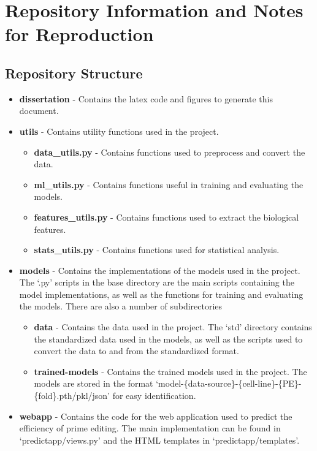 \chapter{Repository Information and Notes for Reproduction}
\label{appendix:repository}

\section{Repository Structure}

\begin{itemize}
    \item \textbf{dissertation} - Contains the latex code and figures to generate this document.
    \item \textbf{utils} - Contains utility functions used in the project. \begin{itemize}
        \item \textbf{data\_utils.py} - Contains functions used to preprocess and convert the data.
        \item \textbf{ml\_utils.py} - Contains functions useful in training and evaluating the models.
        \item \textbf{features\_utils.py} - Contains functions used to extract the biological features.
        \item \textbf{stats\_utils.py} - Contains functions used for statistical analysis.
    \end{itemize}
    \item \textbf{models} - Contains the implementations of the models used in the project. The `.py' scripts in the base directory are the main scripts containing the model implementations, as well as the functions for training and evaluating the models. 
    There are also a number of subdirectories
    \begin{itemize}
        \item \textbf{data} - Contains the data used in the project. The `std' directory contains the standardized data used in the models, as well as the scripts used to convert the data to and from the standardized format.
        \item \textbf{trained-models} - Contains the trained models used in the project. The models are stored in the format `model-\{data-source\}-\{cell-line\}-\{PE\}-\{fold\}.pth/pkl/json' for easy identification.
    \end{itemize}
    \item \textbf{webapp} - Contains the code for the web application used to predict the efficiency of prime editing. The main implementation can be found in `predictapp/views.py' and the HTML templates in `predictapp/templates'.
\end{itemize}

